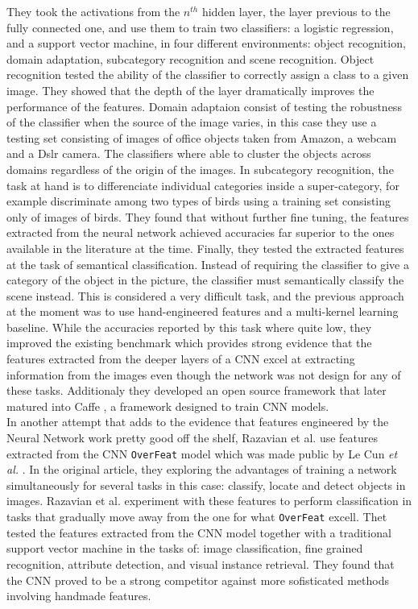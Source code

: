 They took the activations from the $n^{th}$ hidden layer, the layer previous to the fully connected one, and use them to train two classifiers: a logistic regression, and a support vector machine, in four different environments: object recognition, domain adaptation, subcategory recognition and scene recognition. Object recognition tested the ability of the classifier to correctly assign a class to a given image. They showed that the depth of the layer dramatically improves the performance of the features. Domain adaptaion consist of testing the robustness of the classifier when the source of the image varies, in this case they use a testing set consisting of images of office objects taken from Amazon, a webcam and a Dslr camera. The classifiers where able to cluster the objects across domains regardless of the origin of the images. In subcategory recognition, the task at hand is to differenciate individual categories inside a super-category, for example discriminate among two types of birds using a training set consisting only of images of birds. They found that without further fine tuning, the features extracted from the neural network achieved accuracies far superior to the ones available in the literature at the time. Finally, they tested the extracted features at the task of semantical classification. Instead of requiring the classifier to give a category of the object in the picture, the classifier must semantically classify the scene instead. This is considered a very difficult task, and the previous approach at the moment was to use hand-engineered features and a multi-kernel learning baseline. While the accuracies reported by this task where quite low, they improved the existing benchmark which provides strong evidence that the features extracted from the deeper layers of a CNN excel at extracting information from the images even though the network was not design for any of these tasks. Additionaly they developed an open source framework that later matured into Caffe \cite{jia2014caffe}, a framework designed to train CNN models.\\


In another attempt that adds to the evidence that features engineered by the Neural Network work pretty good off the shelf, Razavian {et al.} \cite{DBLP:journals/corr/RazavianASC14} use features extracted from the CNN \texttt{OverFeat} model which was made public by Le Cun \textit{et al.} \cite{DBLP:journals/corr/SermanetEZMFL13}. In the original article, they exploring the advantages of training a network simultaneously for several tasks in this case: classify, locate and detect objects in images. Razavian {et al.} experiment with these features to perform classification in tasks that gradually move away from the one for what \texttt{OverFeat} excell. Thet tested the features extracted from the CNN model together with a traditional support vector machine in the tasks of: image classification, fine grained recognition, attribute detection, and visual instance retrieval. They found that the CNN proved to be a strong competitor against more sofisticated methods involving handmade features.\\

